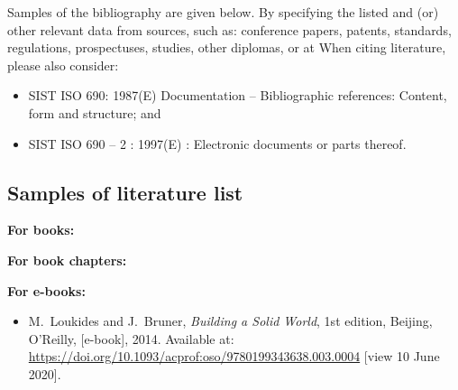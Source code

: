 Samples of the bibliography are given below. By specifying the listed and (or)
other relevant data from sources, such as: conference papers,
patents, standards, regulations, prospectuses, studies, other diplomas, or at
When citing literature, please also consider:
\begin{itemize}
\item SIST ISO 690: 1987(E) Documentation – Bibliographic references:
Content, form and structure; and
\item SIST ISO 690 – 2 : 1997(E) : Electronic documents or parts thereof.
\end{itemize}


\subsection{Samples of literature list}\label{sec:literature_samples}

\textbf{For books:}

\textbf{For book chapters:}

\textbf{For e-books:}
\begin{itemize}
\item[{[4]}] M.~Loukides and J.~Bruner, \emph{Building a Solid World},
1st edition,
Beijing, O'Reilly, [e-book], 2014. Available at:
\url{https://doi.org/10.1093/acprof:oso/9780199343638.003.0004} [view 10
June 2020].
\end{itemize}

